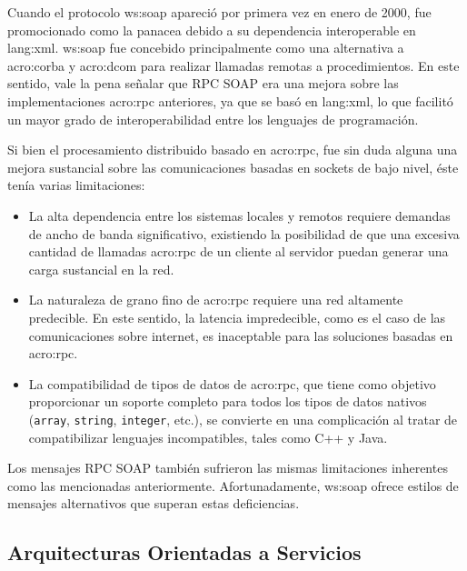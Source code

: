 Cuando el protocolo \gls{ws:soap} apareció por primera vez en enero de 2000, fue promocionado como la panacea debido a su dependencia interoperable en \gls{lang:xml}. \gls{ws:soap} fue concebido principalmente como una alternativa a \gls{acro:corba} y \gls{acro:dcom} para realizar llamadas remotas a procedimientos. En este sentido, vale la pena señalar que RPC SOAP era una mejora sobre las implementaciones \gls{acro:rpc} anteriores, ya que se basó en \gls{lang:xml}, lo que facilitó un mayor grado de interoperabilidad entre los lenguajes de programación.

Si bien el procesamiento distribuido basado en \gls{acro:rpc}, fue sin duda alguna una mejora sustancial sobre las comunicaciones basadas en sockets de bajo nivel, éste tenía varias limitaciones\cite[p.~6]{opensourcesoa:davis}:

\begin{itemize}
  \item La alta dependencia entre los sistemas locales y remotos requiere demandas de ancho de banda significativo, existiendo la posibilidad de que una excesiva cantidad de llamadas \gls{acro:rpc} de un cliente al servidor puedan generar una carga sustancial en la red.
  \item La naturaleza de grano fino de \gls{acro:rpc} requiere una red altamente predecible. En este sentido, la latencia impredecible, como es el caso de las comunicaciones sobre internet, es inaceptable para las soluciones basadas en \gls{acro:rpc}.
  \item La compatibilidad de tipos de datos de \gls{acro:rpc}, que tiene como objetivo proporcionar un soporte completo para todos los tipos de datos nativos (\texttt{array}, \texttt{string}, \texttt{integer}, etc.), se convierte en una complicación al tratar de compatibilizar lenguajes incompatibles, tales como C++ y Java.
\end{itemize}

Los mensajes RPC SOAP también sufrieron las mismas limitaciones inherentes como las mencionadas anteriormente. Afortunadamente, \gls{ws:soap} ofrece estilos de mensajes alternativos que superan estas deficiencias.


\subsection{Arquitecturas Orientadas a Servicios}
\label{soa:definicion}

